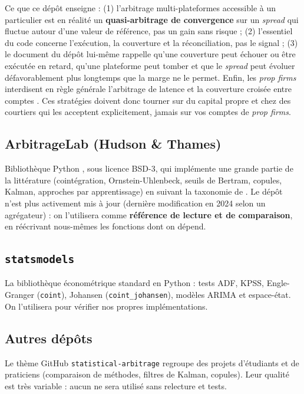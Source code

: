 \begin{pitfall}
Ce que ce dépôt enseigne : (1) l'arbitrage \og multi-plateformes\fg{} accessible à un particulier est en réalité un \textbf{quasi-arbitrage de convergence} sur un \emph{spread} qui fluctue autour d'une valeur de référence, pas un gain sans risque ; (2) l'essentiel du code concerne l'exécution, la couverture et la réconciliation, pas le signal ; (3) le document du dépôt lui-même rappelle qu'une couverture peut échouer ou être exécutée en retard, qu'une plateforme peut tomber et que le \emph{spread} peut évoluer défavorablement plus longtemps que la marge ne le permet. Enfin, les \emph{prop firms} interdisent en règle générale l'arbitrage de latence et la couverture croisée entre comptes \citep{nexusfi}. Ces stratégies doivent donc tourner sur du capital propre et chez des courtiers qui les acceptent explicitement, jamais sur vos comptes de \emph{prop firms}.
\end{pitfall}

\subsection{ArbitrageLab (Hudson \& Thames)}
Bibliothèque Python \citep{arbitragelab}, sous licence BSD-3, qui implémente une grande partie de la littérature (cointégration, Ornstein-Uhlenbeck, seuils de Bertram, copules, Kalman, approches par apprentissage) en suivant la taxonomie de \citet{krauss2017survey}. Le dépôt n'est plus activement mis à jour (dernière modification en 2024 selon un agrégateur) : on l'utilisera comme \textbf{référence de lecture et de comparaison}, en réécrivant nous-mêmes les fonctions dont on dépend.

\subsection{\texttt{statsmodels}}
La bibliothèque économétrique standard en Python \citep{statsmodels} : tests ADF, KPSS, Engle-Granger (\texttt{coint}), Johansen (\texttt{coint\_johansen}), modèles ARIMA et espace-état. On l'utilisera pour vérifier nos propres implémentations.

\subsection{Autres dépôts}
Le thème GitHub \texttt{statistical-arbitrage} regroupe des projets d'étudiants et de praticiens (comparaison de méthodes, filtres de Kalman, copules). Leur qualité est très variable : aucun ne sera utilisé sans relecture et tests.

